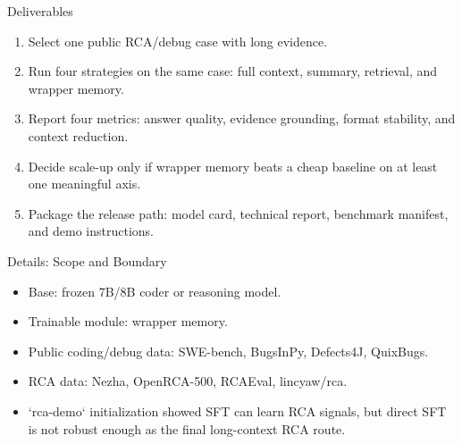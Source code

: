 \begin{frame}{Deliverables}
  \begin{enumerate}
    \item Select one public RCA/debug case with long evidence.
    \item Run four strategies on the same case: full context, summary, retrieval, and wrapper memory.
    \item Report four metrics: answer quality, evidence grounding, format stability, and context reduction.
    \item Decide scale-up only if wrapper memory beats a cheap baseline on at least one meaningful axis.
    \item Package the release path: model card, technical report, benchmark manifest, and demo instructions.
  \end{enumerate}
\end{frame}

\begin{frame}{Details: Scope and Boundary}
  \begin{itemize}
    \item Base: frozen 7B/8B coder or reasoning model.
    \item Trainable module: wrapper memory.
    \item Public coding/debug data: SWE-bench, BugsInPy, Defects4J, QuixBugs.
    \item RCA data: Nezha, OpenRCA-500, RCAEval, lincyaw/rca.
    \item `rca-demo` initialization showed SFT can learn RCA signals, but direct SFT is not robust enough as the final long-context RCA route.
  \end{itemize}
\end{frame}

